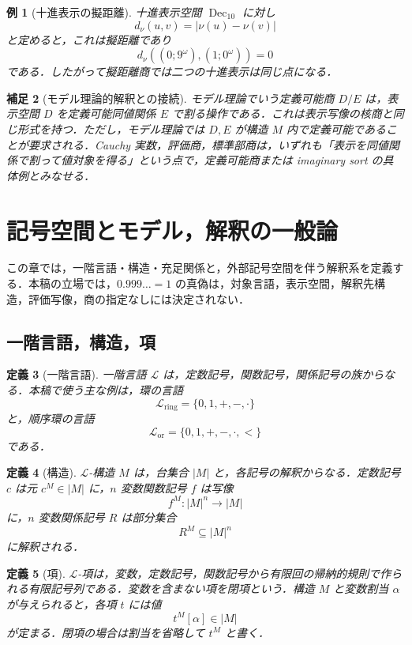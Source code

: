 \documentclass[a4paper,11pt]{ltjsarticle}
\theoremstyle{jpdef}
\newtheorem{definition}{定義}[section]
\newtheorem{remark}[definition]{補足}
\newtheorem{example}[definition]{例}
\theoremstyle{jpthm}
\newcommand{\Lang}{\mathcal L}
\newcommand{\Dec}{\operatorname{Dec}_{10}}
\begin{document}
\begin{example}[十進表示の擬距離]
十進表示空間 \(\Dec\) に対し
\[
  d_\nu(u,v)=|\nu(u)-\nu(v)|
\]
と定めると，これは擬距離であり
\[
  d_\nu((0;9^\omega),(1;0^\omega))=0
\]
である．したがって擬距離商では二つの十進表示は同じ点になる．
\end{example}

\begin{remark}[モデル理論的解釈との接続]
モデル理論でいう定義可能商 \(D/E\) は，表示空間 \(D\) を定義可能同値関係 \(E\) で割る操作である．これは表示写像の核商と同じ形式を持つ．ただし，モデル理論では \(D,E\) が構造 \(M\) 内で定義可能であることが要求される．Cauchy 実数，評価商，標準部商は，いずれも「表示を同値関係で割って値対象を得る」という点で，定義可能商または imaginary sort の具体例とみなせる．
\end{remark}

\section{記号空間とモデル，解釈の一般論}

この章では，一階言語・構造・充足関係と，外部記号空間を伴う解釈系を定義する．本稿の立場では，\(0.999\ldots=1\) の真偽は，対象言語，表示空間，解釈先構造，評価写像，商の指定なしには決定されない．

\subsection{一階言語，構造，項}

\begin{definition}[一階言語]
一階言語 \(\Lang\) は，定数記号，関数記号，関係記号の族からなる．本稿で使う主な例は，環の言語
\[
  \Lang_{\mathrm{ring}}=\{0,1,+,-,\cdot\}
\]
と，順序環の言語
\[
  \Lang_{\mathrm{or}}=\{0,1,+,-,\cdot,<\}
\]
である．
\end{definition}

\begin{definition}[構造]
\(\Lang\)-構造 \(M\) は，台集合 \(|M|\) と，各記号の解釈からなる．定数記号 \(c\) は元 \(c^M\in |M|\) に，\(n\) 変数関数記号 \(f\) は写像
\[
  f^M:|M|^n\to |M|
\]
に，\(n\) 変数関係記号 \(R\) は部分集合
\[
  R^M\subseteq |M|^n
\]
に解釈される．
\end{definition}

\begin{definition}[項]
\(\Lang\)-項は，変数，定数記号，関数記号から有限回の帰納的規則で作られる有限記号列である．変数を含まない項を閉項という．構造 \(M\) と変数割当 \(\alpha\) が与えられると，各項 \(t\) には値
\[
  t^M[\alpha]\in |M|
\]
が定まる．閉項の場合は割当を省略して \(t^M\) と書く．
\end{definition}
\end{document}
